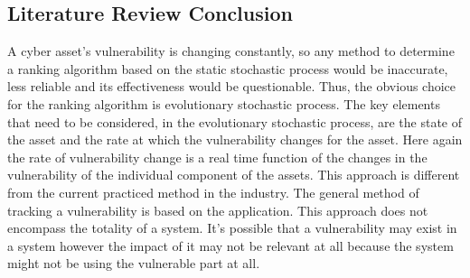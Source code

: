 \subsection{Literature Review Conclusion}\label{ref:lit_rev_conclusion}
A cyber asset's vulnerability is changing constantly, so any method to determine a ranking algorithm based on the static stochastic process would be inaccurate, less reliable and its effectiveness would be questionable. Thus, the obvious choice for the ranking algorithm is evolutionary stochastic process. The key elements that need to be considered, in the evolutionary stochastic process, are the state of the asset and the rate at which the vulnerability changes for the asset. Here again the rate of vulnerability change is a real time function of the changes in the vulnerability of the individual component of the assets. This approach is different from the current practiced method in the industry. The general method of tracking a vulnerability is based on the application. This approach does not encompass the totality of a system. It's possible that a vulnerability may exist in a system however the impact of it may not be relevant at all because the system might not be using the vulnerable part at all.\\ 

%

